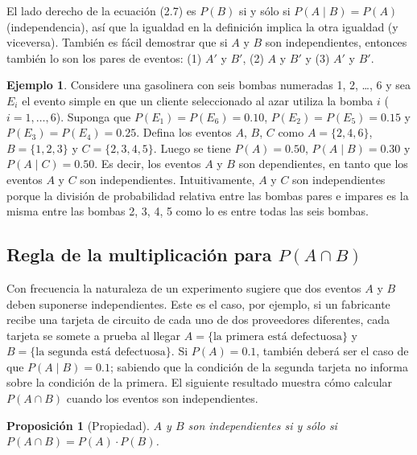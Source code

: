 \documentclass[
  11pt,
]{book}
\newtheorem{proposition}{Proposición}[chapter]
\theoremstyle{definition}
\theoremstyle{definition}
\newtheorem{example}{Ejemplo}[chapter]
\theoremstyle{definition}
\theoremstyle{definition}
\theoremstyle{remark}
\begin{document}
El lado derecho de la ecuación (2.7) es \(P(B)\) si y sólo si \(P(A \mid B) = P(A)\) (independencia), así que la igualdad en la definición implica la otra igualdad (y viceversa). También es fácil demostrar que si \(A\) y \(B\) son independientes, entonces también lo son los pares de eventos: (1) \(A'\) y \(B'\), (2) \(A\) y \(B'\) y (3) \(A'\) y \(B'\).

\begin{example}
Considere una gasolinera con seis bombas numeradas 1, 2, \ldots, 6 y sea \(E_i\) el evento simple en que un cliente seleccionado al azar utiliza la bomba \(i\) (\(i = 1, \ldots, 6\)). Suponga que \(P(E_1) = P(E_6) = 0.10\), \(P(E_2) = P(E_5) = 0.15\) y \(P(E_3) = P(E_4) = 0.25\). Defina los eventos \(A\), \(B\), \(C\) como \(A = \{2, 4, 6\}\), \(B = \{1, 2, 3\}\) y \(C = \{2, 3, 4, 5\}\). Luego se tiene \(P(A) = 0.50\), \(P(A \mid B) = 0.30\) y \(P(A \mid C) = 0.50\). Es decir, los eventos \(A\) y \(B\) son dependientes, en tanto que los eventos \(A\) y \(C\) son independientes. Intuitivamente, \(A\) y \(C\) son independientes porque la división de probabilidad relativa entre las bombas pares e impares es la misma entre las bombas 2, 3, 4, 5 como lo es entre todas las seis bombas.
\end{example}

\subsection{\texorpdfstring{Regla de la multiplicación para \(P(A \cap B)\)}{Regla de la multiplicación para P(A \textbackslash cap B)}}\label{regla-de-la-multiplicaciuxf3n-para-pa-cap-b-1}

Con frecuencia la naturaleza de un experimento sugiere que dos eventos \(A\) y \(B\) deben suponerse independientes. Este es el caso, por ejemplo, si un fabricante recibe una tarjeta de circuito de cada uno de dos proveedores diferentes, cada tarjeta se somete a prueba al llegar \(A = \{ \text{la primera está defectuosa} \}\) y \(B = \{ \text{la segunda está defectuosa} \}\). Si \(P(A) = 0.1\), también deberá ser el caso de que \(P(A \mid B) = 0.1\); sabiendo que la condición de la segunda tarjeta no informa sobre la condición de la primera. El siguiente resultado muestra cómo calcular \(P(A \cap B)\) cuando los eventos son independientes.

\begin{proposition}[Propiedad]
\(A\) y \(B\) son independientes si y sólo si \(P(A \cap B) = P(A) \cdot P(B)\).
\end{proposition}
\end{document}
